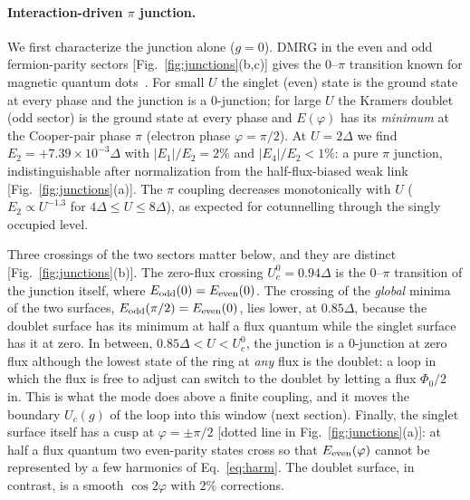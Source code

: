 \paragraph*{Interaction-driven $\pi$ junction.}
We first characterize the junction alone ($g=0$). DMRG in the even and odd fermion-parity
sectors [Fig.~\ref{fig:junctions}(b,c)] gives the $0$--$\pi$ transition known for magnetic quantum
dots~\cite{GlazmanMatveev1989,SpivakKivelson1991,Vecino2003,Karrasch2008,vanDam2006,Cleuziou2006,Delagrange2015}.
For small $U$ the singlet (even) state is the ground state at every phase and the junction is a
$0$-junction; for large $U$ the Kramers doublet (odd sector) is the ground state at every phase and
$E(\varphi)$ has its \emph{minimum} at the Cooper-pair phase $\pi$ (electron phase $\varphi=\pi/2$).
At $U=2\Delta$ we find $E_2=+7.39\times10^{-3}\Delta$ with $|E_1|/E_2=2\%$ and
$|E_4|/E_2<1\%$: a pure $\pi$ junction, indistinguishable after normalization from the
half-flux-biased weak link [Fig.~\ref{fig:junctions}(a)]. The $\pi$ coupling decreases
monotonically with $U$ ($E_2\propto U^{-1.3}$ for $4\Delta\le U\le8\Delta$), as expected for
cotunnelling through the singly occupied level.

Three crossings of the two sectors matter below, and they are distinct
[Fig.~\ref{fig:junctions}(b)]. The zero-flux crossing $U_c^0=0.94\Delta$ is the $0$--$\pi$
transition of the junction itself, where $E_{\rm odd}(0)=E_{\rm even}(0)$. The crossing of the
\emph{global} minima of the two surfaces, $E_{\rm odd}(\pi/2)=E_{\rm even}(0)$, lies lower, at
$0.85\Delta$, because the doublet surface has its minimum at half a flux quantum while the singlet
surface has it at zero. In between, $0.85\Delta<U<U_c^0$, the junction is a $0$-junction at zero flux
although the lowest state of the ring at \emph{any} flux is the doublet: a loop in which the flux
is free to adjust can switch to the doublet by letting a flux $\Phi_0/2$ in. This is what the mode
does above a finite coupling, and it moves the boundary $U_c(g)$ of the loop into this window
(next section). Finally, the singlet surface itself has a cusp at $\varphi=\pm\pi/2$
[dotted line in Fig.~\ref{fig:junctions}(a)]: at half a flux quantum two even-parity states cross
so that $E_{\rm even}(\varphi)$ cannot
be represented by a few harmonics of Eq.~\eqref{eq:harm}. The doublet surface, in contrast, is a
smooth $\cos2\varphi$ with $2\%$ corrections.

